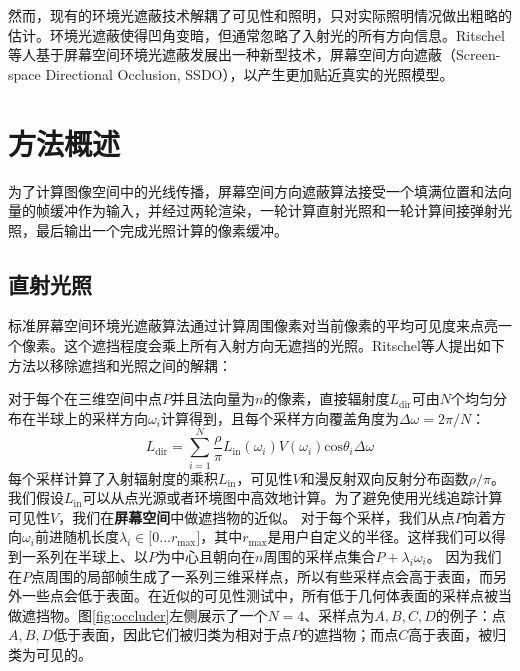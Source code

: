 \documentclass[10pt,a4paper]{article}
\theoremstyle{mythm}%
\numberwithin{equation}{section}
\begin{document}
\begin{CJK*}{UTF8}{song}
然而，现有的环境光遮蔽技术解耦了可见性和照明，只对实际照明情况做出粗略的估计。环境光遮蔽使得凹角变暗，但通常忽略了入射光的所有方向信息。Ritschel等人\cite{Ritschel:2009:SSDO}基于屏幕空间环境光遮蔽发展出一种新型技术，屏幕空间方向遮蔽（Screen-space Directional Occlusion, SSDO），以产生更加贴近真实的光照模型。


\section{方法概述}

为了计算图像空间中的光线传播，屏幕空间方向遮蔽算法接受一个填满位置和法向量的帧缓冲作为输入\cite{SegoviaIMP06}，并经过两轮渲染，一轮计算直射光照和一轮计算间接弹射光照，最后输出一个完成光照计算的像素缓冲。

\subsection{直射光照}

标准屏幕空间环境光遮蔽算法通过计算周围像素对当前像素的平均可见度来点亮一个像素。这个遮挡程度会乘上所有入射方向无遮挡的光照。Ritschel等人提出如下方法以移除遮挡和光照之间的解耦：

对于每个在三维空间中点$P$并且法向量为$n$的像素，直接辐射度$L_{\text{dir}}$可由$N$个均匀分布在半球上的采样方向$\omega_i$计算得到，且每个采样方向覆盖角度为$\Delta\omega=2\pi/N$：
\begin{equation*}
L_{\text{dir}}=\sum^N_{i=1}\frac{\rho}{\pi}L_{\text{in}}(\omega_i)V(\omega_i)\text{cos}\theta_i\Delta\omega
\end{equation*}
每个采样计算了入射辐射度的乘积$L_\text{in}$，可见性$V$和漫反射双向反射分布函数$\rho/\pi$。我们假设$L_\text{in}$可以从点光源或者环境图中高效地计算。为了避免使用光线追踪计算可见性$V$，我们在\textbf{屏幕空间}中做遮挡物的近似。
对于每个采样，我们从点$P$向着方向$\omega_i$前进随机长度$\lambda_i\in\lbrack 0...r_{\text{max}}\rbrack$，其中$r_{\text{max}}$是用户自定义的半径。这样我们可以得到一系列在半球上、以$P$为中心且朝向在$n$周围的采样点集合$P+\lambda_i\omega_i$。
因为我们在$P$点周围的局部帧生成了一系列三维采样点，所以有些采样点会高于表面，而另外一些点会低于表面。在近似的可见性测试中，所有低于几何体表面的采样点被当做遮挡物。图\ref{fig:occluder}左侧展示了一个$N=4$、采样点为$A,B,C,D$的例子：点$A,B,D$低于表面，因此它们被归类为相对于点$P$的遮挡物；而点$C$高于表面，被归类为可见的。


\end{CJK*}
\end{document}
